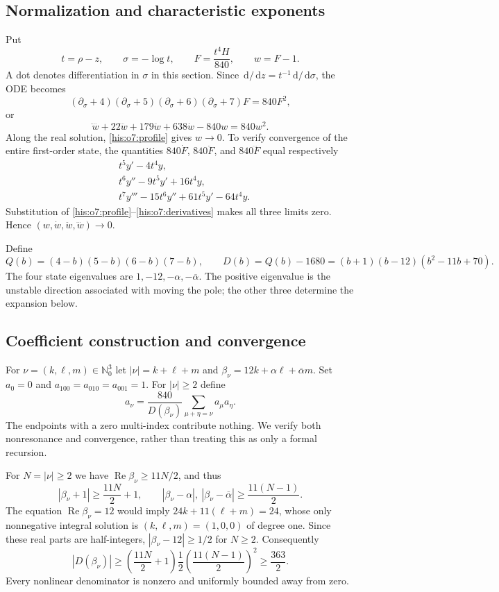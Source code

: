 \documentclass[11pt]{article}
\theoremstyle{remark}\newtheorem{remark}[theorem]{Remark}
\DeclareMathOperator{\Rea}{Re}
\newcommand{\dd}{\,\mathrm d}
\newcommand{\N}{\mathbb N}
\newcommand{\ba}{\overline\alpha}
\numberwithin{equation}{section}
\begin{document}
\subsection{Normalization and characteristic exponents}
Put
\[
t=\rho-z,\qquad \sigma=-\log t,\qquad F=\frac{t^4H}{840},
\qquad w=F-1.
\]
A dot denotes differentiation in $\sigma$ in this section.
Since $\dd/\dd z=t^{-1}\dd/\dd\sigma$, the ODE becomes
\[
(\partial_\sigma+4)(\partial_\sigma+5)
(\partial_\sigma+6)(\partial_\sigma+7)F=840F^2,
\]
or
\begin{equation}\label{his:o7:normalized}
\ddddot w+22\dddot w+179\ddot w+638\dot w-840w=840w^2.
\end{equation}
Along the real solution, \eqref{his:o7:profile} gives $w\to0$.
To verify convergence of the entire first-order state, the quantities
$840\dot F$, $840\ddot F$, and $840\dddot F$ equal respectively
\begin{align*}
&t^5y'-4t^4y,\\
&t^6y''-9t^5y'+16t^4y,\\
&t^7y'''-15t^6y''+61t^5y'-64t^4y.
\end{align*}
Substitution of \eqref{his:o7:profile}--\eqref{his:o7:derivatives} makes all three
limits zero. Hence $(w,\dot w,\ddot w,\dddot w)\to0$.

Define
\begin{equation}\label{his:o7:indicial}
Q(b)=(4-b)(5-b)(6-b)(7-b),\qquad
D(b)=Q(b)-1680=(b+1)(b-12)(b^2-11b+70).
\end{equation}
The four state eigenvalues are $1,-12,-\alpha,-\ba$.
The positive eigenvalue is the unstable direction associated with
moving the pole; the other three determine the expansion below.

\subsection{Coefficient construction and convergence}
For $\nu=(k,\ell,m)\in\N_0^3$ let $|\nu|=k+\ell+m$ and
$\beta_\nu=12k+\alpha\ell+\ba m$.
Set $a_0=0$ and $a_{100}=a_{010}=a_{001}=1$. For $|\nu|\ge2$ define
\begin{equation}\label{his:o7:psi-rec}
a_\nu=\frac{840}{D(\beta_\nu)}
\sum_{\mu+\eta=\nu}a_\mu a_\eta.
\end{equation}
The endpoints with a zero multi-index contribute nothing.
We verify both nonresonance and convergence, rather than treating
this as only a formal recursion.

For $N=|\nu|\ge2$ we have $\Rea\beta_\nu\ge11N/2$, and thus
\[
|\beta_\nu+1|\ge\frac{11N}2+1,\qquad
|\beta_\nu-\alpha|,\ |\beta_\nu-\ba|
\ge\frac{11(N-1)}2.
\]
The equation $\Rea\beta_\nu=12$ would imply
$24k+11(\ell+m)=24$, whose only nonnegative integral solution
is $(k,\ell,m)=(1,0,0)$ of degree one. Since these real parts are
half-integers, $|\beta_\nu-12|\ge1/2$ for $N\ge2$. Consequently
\begin{equation}\label{his:o7:denom}
|D(\beta_\nu)|\ge
\left(\frac{11N}2+1\right)\frac12
\left(\frac{11(N-1)}2\right)^2\ge\frac{363}{2}.
\end{equation}
Every nonlinear denominator is nonzero and uniformly bounded away
from zero.
\end{document}
